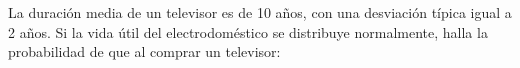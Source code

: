 \documentclass[addpoints,spanish, 12pt,a4paper]{exam}
\begin{document}
\begin{questions}
\question La duración media de un televisor es de 10 años, con una desviación típica igual a 2 años. Si la
vida útil del electrodoméstico se distribuye normalmente, halla la probabilidad de que al comprar
un televisor: 
    
        
        

\addpoints
        
\end{questions}
\end{document}
